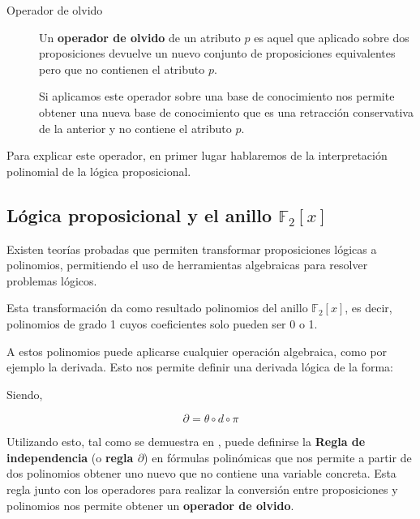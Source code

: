 	 \begin{description}
	 	\item[Operador de olvido]  	
	 	Un \textbf{operador de olvido} de un atributo $p$ es aquel que aplicado sobre dos proposiciones devuelve un 
	 	nuevo conjunto de proposiciones equivalentes pero que no contienen el atributo $p$.
	 	
	 	Si aplicamos este operador sobre una base de conocimiento
	 	nos permite obtener una nueva base de conocimiento que es una retracción conservativa de la anterior y no contiene el atributo $p$.
	 \end{description}
	 
	 Para explicar este operador, en primer lugar hablaremos de la interpretación polinomial de la lógica proposicional.
	 
	 \subsection*{Lógica proposicional y el anillo $\mathbb{F}_2[x]$}
	 	
	 	Existen teorías probadas  que permiten transformar proposiciones lógicas a polinomios, permitiendo el uso de herramientas algebraicas para resolver problemas lógicos.
	 	
	 	Esta transformación da como resultado polinomios del anillo  $\mathbb{F}_2[x]$, es decir, polinomios de grado 1 cuyos coeficientes solo pueden ser 0 o 1.
	 	
	 	
	 	A estos polinomios puede aplicarse cualquier operación algebraica, como por ejemplo la derivada. Esto nos permite definir una derivada lógica de la forma:
	 	
	 	
	 	Siendo,
	 	
	 	\[
	 		\partial = \theta \circ d \circ \pi
	 	\]
	 	
	 	Utilizando esto, tal como se demuestra en , puede definirse la \textbf{Regla de independencia} (o \textbf{regla $\partial$}) en fórmulas polinómicas que nos permite a partir de dos polinomios obtener uno nuevo que no contiene una variable concreta. Esta regla junto con los operadores para realizar la conversión entre proposiciones y polinomios nos permite obtener un \textbf{operador de olvido}.
	
	 
 	

 